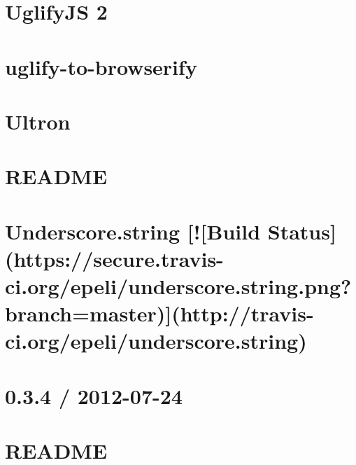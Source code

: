 \documentclass[twoside]{book}
\newcommand{\+}{\discretionary{\mbox{\scriptsize$\hookleftarrow$}}{}{}}
\begin{document}
\chapter{Uglify\+JS 2}
\label{md_app_web_node_modules_uglify-js__r_e_a_d_m_e}

\chapter{uglify-\/to-\/browserify}
\label{md_app_web_node_modules_uglify-to-browserify__r_e_a_d_m_e}

\chapter{Ultron}
\label{md_app_web_node_modules_ultron__r_e_a_d_m_e}

\chapter{R\+E\+A\+D\+ME}
\label{md_app_web_node_modules_underscore__r_e_a_d_m_e}

\chapter{Underscore.\+string \mbox{[}!\mbox{[}Build Status\mbox{]}(https\+://secure.travis-\/ci.org/epeli/underscore.string.\+png?branch=master)\mbox{]}(http\+://travis-\/ci.org/epeli/underscore.string)}
\label{md_app_web_node_modules_underscore_8string__r_e_a_d_m_e}

\chapter{0.3.4 / 2012-\/07-\/24}
\label{md_app_web_node_modules_union__c_h_a_n_g_e_l_o_g}

\chapter{R\+E\+A\+D\+ME}
\label{md_app_web_node_modules_union__r_e_a_d_m_e}

\end{document}
